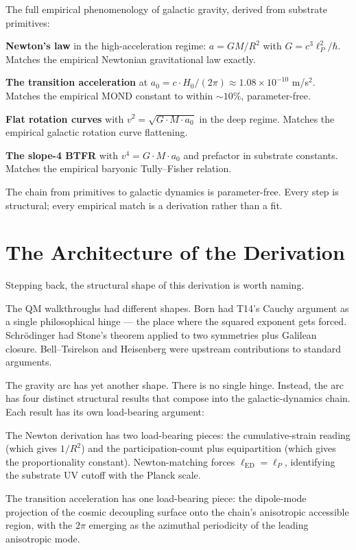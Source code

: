 \documentclass[11pt,a4paper]{article}
\begin{document}
The full empirical phenomenology of galactic gravity, derived from substrate primitives:

\textbf{Newton's law} in the high-acceleration regime: $a = GM/R^2$ with $G = c^3\ell_P^2/\hbar$. Matches the empirical Newtonian gravitational law exactly.

\textbf{The transition acceleration} at $a_0 = c\cdot H_0/(2\pi) \approx 1.08 \times 10^{-10}$ m/s$^2$. Matches the empirical MOND constant to within $\sim 10\%$, parameter-free.

\textbf{Flat rotation curves} with $v^2 = \sqrt{G\cdot M\cdot a_0}$ in the deep regime. Matches the empirical galactic rotation curve flattening.

\textbf{The slope-4 BTFR} with $v^4 = G\cdot M\cdot a_0$ and prefactor in substrate constants. Matches the empirical baryonic Tully--Fisher relation.

The chain from primitives to galactic dynamics is parameter-free. Every step is structural; every empirical match is a derivation rather than a fit.

\section{The Architecture of the Derivation}

Stepping back, the structural shape of this derivation is worth naming.

The QM walkthroughs had different shapes. Born had T14's Cauchy argument as a single philosophical hinge --- the place where the squared exponent gets forced. Schr\"odinger had Stone's theorem applied to two symmetries plus Galilean closure. Bell--Tsirelson and Heisenberg were upstream contributions to standard arguments.

The gravity arc has yet another shape. There is no single hinge. Instead, the arc has four distinct structural results that compose into the galactic-dynamics chain. Each result has its own load-bearing argument:

The Newton derivation has two load-bearing pieces: the cumulative-strain reading (which gives $1/R^2$) and the participation-count plus equipartition (which gives the proportionality constant). Newton-matching forces $\ell_{\mathrm{ED}} = \ell_P$, identifying the substrate UV cutoff with the Planck scale.

The transition acceleration has one load-bearing piece: the dipole-mode projection of the cosmic decoupling surface onto the chain's anisotropic accessible region, with the $2\pi$ emerging as the azimuthal periodicity of the leading anisotropic mode.
\end{document}
